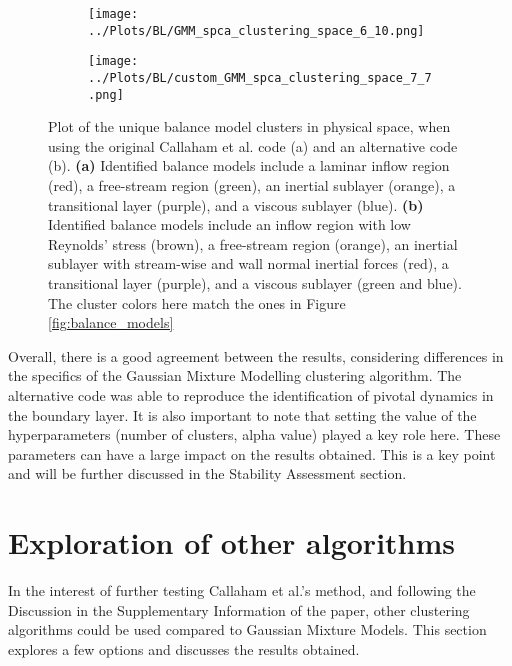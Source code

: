 \documentclass[12pt]{report} %
\begin{document}
\begin{figure}[htbp]
  \centering
  \begin{subfigure}[b]{0.7\textwidth}
      \texttt{[image: ../Plots/BL/GMM\_spca\_clustering\_space\_6\_10.png]}
      \caption{}
  \end{subfigure}
  \begin{subfigure}[b]{0.7\textwidth}
      \texttt{[image: ../Plots/BL/custom\_GMM\_spca\_clustering\_space\_7\_7.png]}
      \caption{}
  \end{subfigure}
  \caption{Plot of the unique balance model clusters in physical space, when using the original Callaham et al. code (a) and an alternative code (b). \textbf{(a)} Identified balance models include a laminar inflow region (red), a free-stream region (green), an inertial sublayer (orange), a transitional layer (purple), and a viscous sublayer (blue). \textbf{(b)} Identified balance models include an inflow region with low Reynolds' stress (brown), a free-stream region (orange), an inertial sublayer with stream-wise and wall normal inertial forces (red), a transitional layer (purple), and a viscous sublayer (green and blue). The cluster colors here match the ones in Figure \ref{fig:balance_models}}
  \label{fig:balance_model_clusters}
\end{figure}

Overall, there is a good agreement between the results, considering differences in the specifics of the Gaussian Mixture Modelling clustering algorithm. The alternative code was able to reproduce the identification of pivotal dynamics in the boundary layer. It is also important to note that setting the value of the hyperparameters (number of clusters, alpha value) played a key role here. These parameters can have a large impact on the results obtained. This is a key point and will be further discussed in the Stability Assessment section.

\newpage

\section{Exploration of other algorithms}

In the interest of further testing Callaham et al.’s method, and following the Discussion in the Supplementary Information of the paper\cite{callaham2021learning}, other clustering algorithms could be used compared to Gaussian Mixture Models. This section explores a few options and discusses the results obtained.
\end{document}

